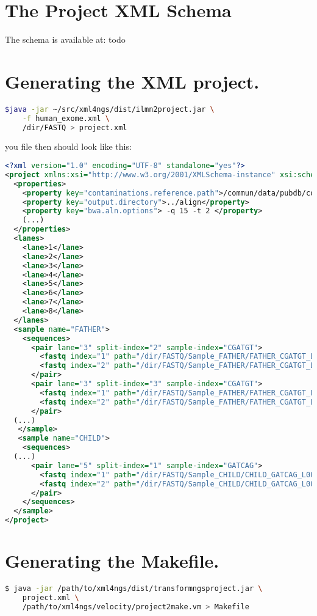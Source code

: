 \documentclass{article}
\begin{document}
\section{The Project XML Schema}
The schema is available at: todo

\section{Generating the XML project.}

\begin{lstlisting}[language=bash]
$java -jar ~/src/xml4ngs/dist/ilmn2project.jar \
	-f human_exome.xml \
	/dir/FASTQ > project.xml
\end{lstlisting}

you file then should look like this:
\begin{lstlisting}[language=XML,breaklines=true]
<?xml version="1.0" encoding="UTF-8" standalone="yes"?>
<project xmlns:xsi="http://www.w3.org/2001/XMLSchema-instance" xsi:schemaLocation="https://raw.github.com/lindenb/xml4ngs/master/src/main/resources/xsd/project.xsd">
  <properties>
    <property key="contaminations.reference.path">/commun/data/pubdb/contaminants/contaminants.fa</property>
    <property key="output.directory">../align</property>
    <property key="bwa.aln.options"> -q 15 -t 2 </property>
    (...)
  </properties>
  <lanes>
    <lane>1</lane>
    <lane>2</lane>
    <lane>3</lane>
    <lane>4</lane>
    <lane>5</lane>
    <lane>6</lane>
    <lane>7</lane>
    <lane>8</lane>
  </lanes>
  <sample name="FATHER">
    <sequences>
      <pair lane="3" split-index="2" sample-index="CGATGT">
        <fastq index="1" path="/dir/FASTQ/Sample_FATHER/FATHER_CGATGT_L003_R1_002.fastq.gz"/>
        <fastq index="2" path="/dir/FASTQ/Sample_FATHER/FATHER_CGATGT_L003_R2_002.fastq.gz"/>
      </pair>
      <pair lane="3" split-index="3" sample-index="CGATGT">
        <fastq index="1" path="/dir/FASTQ/Sample_FATHER/FATHER_CGATGT_L003_R1_003.fastq.gz"/>
        <fastq index="2" path="/dir/FASTQ/Sample_FATHER/FATHER_CGATGT_L003_R2_003.fastq.gz"/>
      </pair>
  (...)
   </sample>
   <sample name="CHILD">
    <sequences>
  (...)
      <pair lane="5" split-index="1" sample-index="GATCAG">
        <fastq index="1" path="/dir/FASTQ/Sample_CHILD/CHILD_GATCAG_L005_R1_001.fastq.gz"/>
        <fastq index="2" path="/dir/FASTQ/Sample_CHILD/CHILD_GATCAG_L005_R2_001.fastq.gz"/>
      </pair>
    </sequences>
  </sample>
</project>
\end{lstlisting}


\section{Generating the Makefile.}
\begin{lstlisting}[language=bash]
$ java -jar /path/to/xml4ngs/dist/transformngsproject.jar \
 	project.xml \
 	/path/to/xml4ngs/velocity/project2make.vm > Makefile
\end{lstlisting}
\end{document}
